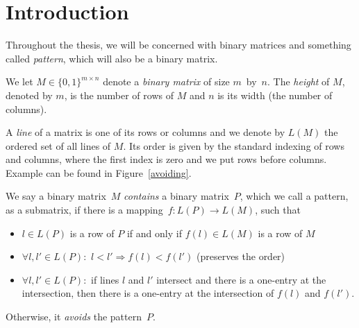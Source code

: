 \chapter*{Introduction}
Throughout the thesis, we will be concerned with binary matrices and something called \emph{pattern}, which will also be a binary matrix.
\begin{defn}
We let $M\in\{0,1\}^{m\times n}$ denote a \emph{binary matrix} of size $m$~by~$n$. The \emph{height} of $M$, denoted by $m$, is the number of rows of $M$ and $n$ is its width (the number of columns).
\end{defn}
\begin{defn}
A \emph{line} of a matrix is one of its rows or columns and we denote by $L(M)$ the ordered set of all lines of $M$. Its order is given by the standard indexing of rows and columns, where the first index is zero and we put rows before columns. Example can be found in Figure~\ref{avoiding}.
\end{defn}
\begin{defn}
We say a binary matrix~$M$ \emph{contains} a binary matrix~$P$, which we call a pattern, as a submatrix, if there is a mapping~$f:L(P)\rightarrow L(M)$, such that
\begin{itemize}
\item $l\in L(P)$ is a row of $P$ if and only if $f(l)\in L(M)$ is a row of $M$
\item $\forall l,l'\in L(P):$ $l<l'\Rightarrow f(l)<f(l')$ (preserves the order)
\item $\forall l,l'\in L(P):$ if lines $l$ and $l'$ intersect and there is a one-entry at the intersection, then there is a one-entry at the intersection of $f(l)$ and $f(l')$.
\end{itemize}
Otherwise, it \emph{avoids} the pattern~$P$.
\end{defn}
